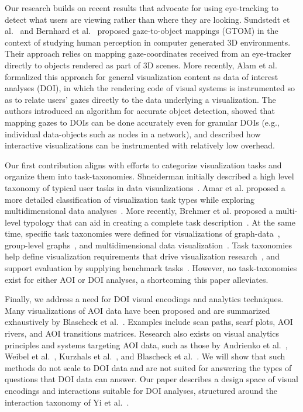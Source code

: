 Our research builds on recent results that advocate for using eye-tracking to detect what users are viewing rather than where they are looking. Sundstedt et al.~\cite{sundstedt2013visual} and Bernhard et al.~\cite{bernhard2014gaze} proposed gaze-to-object mappings (GTOM) in the context of studying human perception in computer generated 3D environments. Their approach relies on mapping gaze-coordinates received from an eye-tracker directly to objects rendered as part of 3D scenes. More recently, Alam et al.~\cite{alam15analyzing} formalized this approach for general visualization content as data of interest analyses (DOI), in which the rendering code of visual systems is instrumented so as to relate users' gazes directly to the data underlying a visualization. The authors introduced an algorithm for accurate object detection, showed that mapping gazes to DOIs can be done accurately even for granular DOIs (e.g., individual data-objects such as nodes in a network), and described how interactive visualizations can be instrumented with relatively low overhead.

Our first contribution aligns with efforts to categorize visualization tasks and organize them into task-taxonomies. Shneiderman initially described a high level taxonomy of typical user tasks in data visualizations~\cite{shneiderman1996eyes}. Amar et al. proposed a more detailed classification of visualization task types while exploring multidimensional data analyses~\cite{amar2005low}.  More recently, Brehmer et al. proposed a multi-level typology that can aid in creating a complete task description~\cite{brehmer2013multi}. At the same time, specific task taxonomies were defined for visualizations of graph-data~\cite{lee2006task}, group-level graphs~\cite{saket2014group}, and multidimensional data  visualization~\cite{ward2002taxonomy}. Task taxonomies help define visualization requirements that drive visualization research~\cite{amar2005low},  and support evaluation by supplying benchmark tasks~\cite{okoe2015graphunit,jianu2014display,ghoniem2004comparison}. However, no task-taxonomies exist for either AOI or DOI analyses, a shortcoming this paper alleviates.   
 
Finally, we address a need for DOI visual encodings and analytics techniques. Many visualizations of AOI data have been proposed and are summarized exhaustively by Blascheck et al.~\cite{blascheck2014state}.  Examples include scan paths, scarf plots, AOI rivers, and AOI transitions matrices. Research also exists on visual analytics principles and systems targeting AOI data, such as those by Andrienko et al.~\cite{andrienko2012visual}, Weibel et al.~\cite{weibel2012let}, Kurzhals et al.~\cite{kurzhals2014iseecube}, and Blascheck et al.~\cite{blascheck2016va}. We will show that such methods do not scale to DOI data and are not suited for answering the types of questions that DOI data can answer. Our paper describes a design space of visual encodings and interactions suitable for DOI analyses, structured around the interaction taxonomy of Yi et al.~\cite{yi2007toward}.


